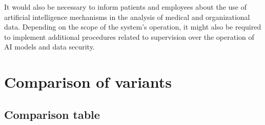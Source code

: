 It would also be necessary to inform patients and employees about the use of artificial intelligence mechanisms in the analysis of medical and organizational data. Depending on the scope of the system's operation, it might also be required to implement additional procedures related to supervision over the operation of AI models and data security.

\section{Comparison of variants}

\subsection{Comparison table}

\renewcommand{\arraystretch}{1.3}

